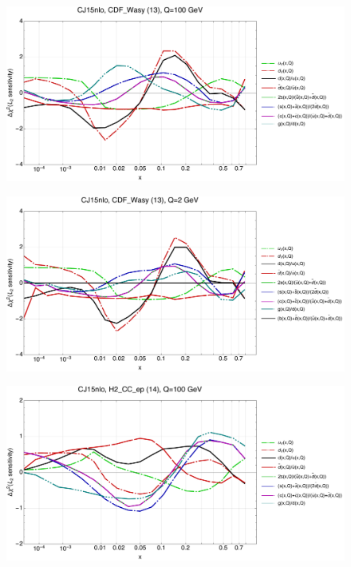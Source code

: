\documentclass[10pt,aps,prd,floatfix,titlepage]{revtex4}
\begin{document}
\clearpage
\begin{figure}
\includegraphics[width=\textwidth,height=0.44\textheight,keepaspectratio]{2/13_CJ15nlo_q100_Sf_2.pdf}
\caption{}
\end{figure}
\begin{figure}
\includegraphics[width=\textwidth,height=0.44\textheight,keepaspectratio]{2/13_CJ15nlo_q2_Sf_2.pdf}
\caption{}
\end{figure}
\clearpage
\begin{figure}
\includegraphics[width=\textwidth,height=0.44\textheight,keepaspectratio]{2/14_CJ15nlo_q100_Sf_2.pdf}
\caption{}
\end{figure}
\end{document}
